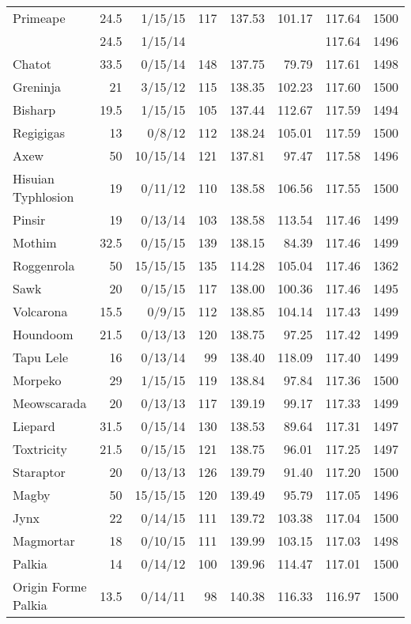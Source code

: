 \begin{longtable}{lrrrrrrr}
Primeape & 24.5 & 1/15/15 & 117 & 137.53 & 101.17 & 117.64 & 1500\\
 & 24.5 & 1/15/14 & & & & 117.64 & 1496\\
Chatot & 33.5 & 0/15/14 & 148 & 137.75 & 79.79 & 117.61 & 1498\\
Greninja & 21 & 3/15/12 & 115 & 138.35 & 102.23 & 117.60 & 1500\\
Bisharp & 19.5 & 1/15/15 & 105 & 137.44 & 112.67 & 117.59 & 1494\\
Regigigas & 13 & 0/8/12 & 112 & 138.24 & 105.01 & 117.59 & 1500\\
Axew & 50 & 10/15/14 & 121 & 137.81 & 97.47 & 117.58 & 1496\\
Hisuian Typhlosion & 19 & 0/11/12 & 110 & 138.58 & 106.56 & 117.55 & 1500\\
Pinsir & 19 & 0/13/14 & 103 & 138.58 & 113.54 & 117.46 & 1499\\
Mothim & 32.5 & 0/15/15 & 139 & 138.15 & 84.39 & 117.46 & 1499\\
Roggenrola & 50 & 15/15/15 & 135 & 114.28 & 105.04 & 117.46 & 1362\\
Sawk & 20 & 0/15/15 & 117 & 138.00 & 100.36 & 117.46 & 1495\\
Volcarona & 15.5 & 0/9/15 & 112 & 138.85 & 104.14 & 117.43 & 1499\\
Houndoom & 21.5 & 0/13/13 & 120 & 138.75 & 97.25 & 117.42 & 1499\\
Tapu Lele & 16 & 0/13/14 & 99 & 138.40 & 118.09 & 117.40 & 1499\\
Morpeko & 29 & 1/15/15 & 119 & 138.84 & 97.84 & 117.36 & 1500\\
Meowscarada & 20 & 0/13/13 & 117 & 139.19 & 99.17 & 117.33 & 1499\\
Liepard & 31.5 & 0/15/14 & 130 & 138.53 & 89.64 & 117.31 & 1497\\
Toxtricity & 21.5 & 0/15/15 & 121 & 138.75 & 96.01 & 117.25 & 1497\\
Staraptor & 20 & 0/13/13 & 126 & 139.79 & 91.40 & 117.20 & 1500\\
Magby & 50 & 15/15/15 & 120 & 139.49 & 95.79 & 117.05 & 1496\\
Jynx & 22 & 0/14/15 & 111 & 139.72 & 103.38 & 117.04 & 1500\\
Magmortar & 18 & 0/10/15 & 111 & 139.99 & 103.15 & 117.03 & 1498\\
Palkia & 14 & 0/14/12 & 100 & 139.96 & 114.47 & 117.01 & 1500\\
Origin Forme Palkia & 13.5 & 0/14/11 & 98 & 140.38 & 116.33 & 116.97 & 1500\\

\end{longtable}

